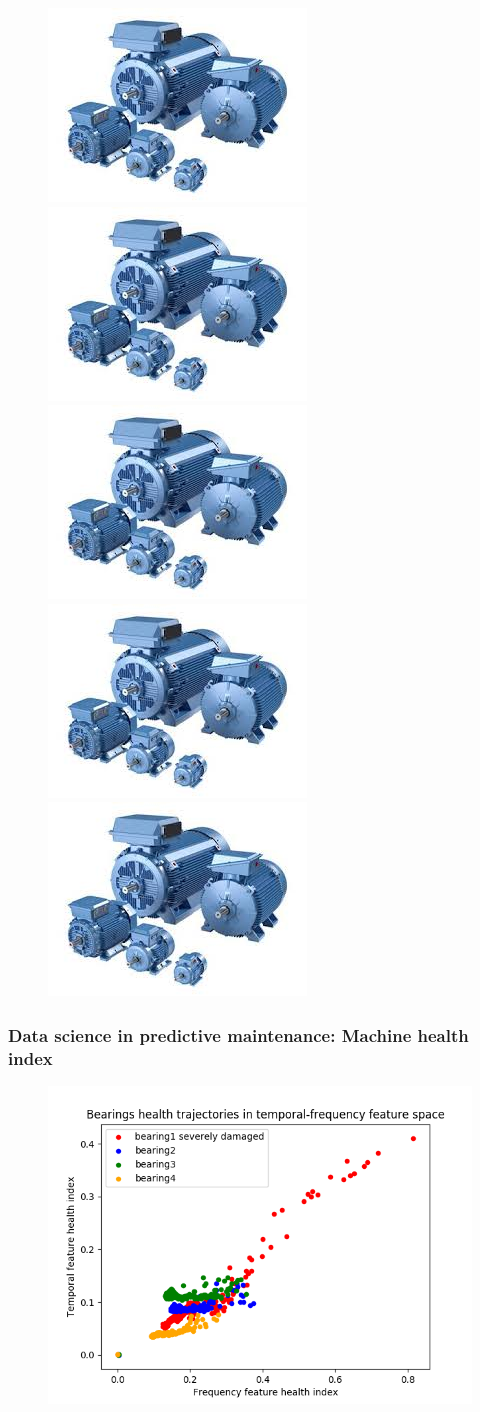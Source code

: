 \documentclass{beamer}
\begin{document}
\begin{frame}
\begin{figure}[H]
		\includegraphics[width=0.2\linewidth]{motor1}
		\includegraphics[width=0.2\linewidth]{motor1}
		\includegraphics[width=0.2\linewidth]{motor1}
		\includegraphics[width=0.2\linewidth]{motor1}
		\includegraphics[width=0.2\linewidth]{motor1}
	\end{figure}
\end{frame}



\begin{frame}
	\frametitle{Data science in predictive maintenance: Machine health index}
	\begin{figure}[H]
		\centering
		\includegraphics[width=0.5\linewidth]{health_plot}
	\end{figure}
\end{frame}
\end{document}
